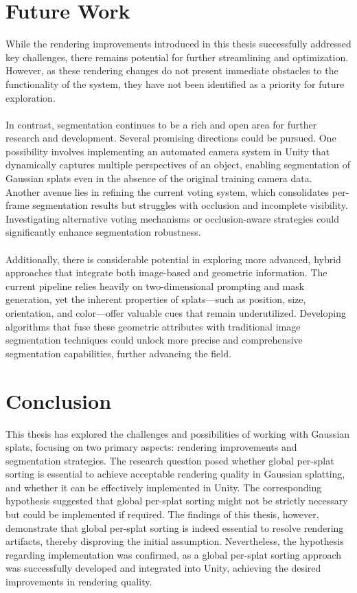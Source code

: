 \documentclass[12pt]{article}
\begin{document}
\section{Future Work}
While the rendering improvements introduced in this thesis successfully addressed key challenges, there remains potential for further streamlining and optimization. However, as these rendering changes do not present immediate obstacles to the functionality of the system, they have not been identified as a priority for future exploration.\\\\
In contrast, segmentation continues to be a rich and open area for further research and development. Several promising directions could be pursued. One possibility involves implementing an automated camera system in Unity that dynamically captures multiple perspectives of an object, enabling segmentation of Gaussian splats even in the absence of the original training camera data.\\
Another avenue lies in refining the current voting system, which consolidates per-frame segmentation results but struggles with occlusion and incomplete visibility. Investigating alternative voting mechanisms or occlusion-aware strategies could significantly enhance segmentation robustness.
\\\\
Additionally, there is considerable potential in exploring more advanced, hybrid approaches that integrate both image-based and geometric information. The current pipeline relies heavily on two-dimensional prompting and mask generation, yet the inherent properties of splats—such as position, size, orientation, and color—offer valuable cues that remain underutilized. Developing algorithms that fuse these geometric attributes with traditional image segmentation techniques could unlock more precise and comprehensive segmentation capabilities, further advancing the field.
\section{Conclusion}
This thesis has explored the challenges and possibilities of working with Gaussian splats, focusing on two primary aspects: rendering improvements and segmentation strategies. The research question posed whether global per-splat sorting is essential to achieve acceptable rendering quality in Gaussian splatting, and whether it can be effectively implemented in Unity. The corresponding hypothesis suggested that global per-splat sorting might not be strictly necessary but could be implemented if required. The findings of this thesis, however, demonstrate that global per-splat sorting is indeed essential to resolve rendering artifacts, thereby disproving the initial assumption. Nevertheless, the hypothesis regarding implementation was confirmed, as a global per-splat sorting approach was successfully developed and integrated into Unity, achieving the desired improvements in rendering quality.
\end{document}
